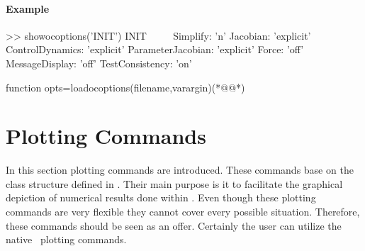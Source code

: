 \paragraph{Example}
\begin{matlab}
>> showocoptions('INIT')
INIT
~~~~
             Simplify: 'n'
             Jacobian: 'explicit'
      ControlDynamics: 'explicit'
    ParameterJacobian: 'explicit'
                Force: 'off'
       MessageDisplay: 'off'
      TestConsistency: 'on'
\end{matlab}
\begin{matlab}
function opts=loadocoptions(filename,varargin)(*@@*)
%
%
%
\end{matlab}

\section{Plotting Commands}
\label{sec:plot_command_sel_com}
In this section plotting commands are introduced. These commands base on the class structure defined in \OCMAT. Their main purpose is it to facilitate the graphical depiction of numerical results done within \OCMAT. Even though these plotting commands are very flexible they cannot cover every possible situation. Therefore, these commands should be seen as an offer. Certainly the user can utilize the native \MATL\ plotting commands.


